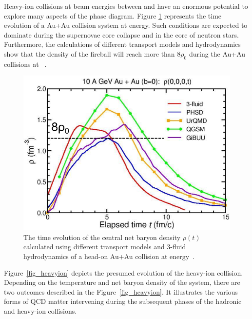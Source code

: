 Heavy-ion collisions at beam energies between  and  have an enormous potential to explore many aspects of the phase diagram. Figure \ref{fig:cbm_density} represents the time evolution of a Au+Au collision system at  energy. Such conditions are expected to dominate during the supernovae core collapse and in the core of neutron stars. Furthermore, the calculations of different transport models and hydrodynamics show that the density of the fireball will reach more than $8\rho_{0}$ during the Au+Au collisions at ~\cite{CBM_physics}.

\begin{figure}[!h]
    \centering
    \includegraphics[width=0.65\columnwidth]{Chapter1/images/CBM_density.png}
    \caption{The time evolution of the central net baryon density $\rho(t)$ calculated using different transport models and 3-fluid hydrodynamics of a head-on Au+Au collision at  energy~\cite{CBM_physics}.}
    \label{fig:cbm_density}
\end{figure}

Figure~\ref{fig_heavyion} depicts the presumed evolution of the heavy-ion collision. Depending on the temperature and net baryon density of the system, there are two outcomes described in the Figure~\ref{fig_heavyion}. It illustrates the various forms of QCD matter intervening during the subsequent phases of the hadronic and heavy-ion collisions.

